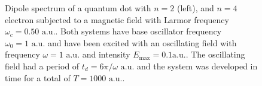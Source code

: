 \begin{figure}[!h]
    \centering
    \caption{Dipole spectrum of a quantum dot with $n=2$ (left), and $n=4$ electron 
    subjected to a magnetic field with Larmor frequency $\omega_c=0.50 \text{ a.u.}$.
    Both systems have base oscillator frequency $\omega_0=1 \text{ a.u.}$ and 
    have been excited with an oscillating field with frequency $\omega = 1 \text{ a.u.}$
    and intensity $E_\text{max} = 0.1 \text{a.u.}$. The oscillating field had a period of 
    $t_d = 6\pi/\omega \text{ a.u.}$ and the system was developed in time for a total 
    of $T = 1000 \text{ a.u.}$.}
    \label{fig:b_omc050}
\end{figure}

